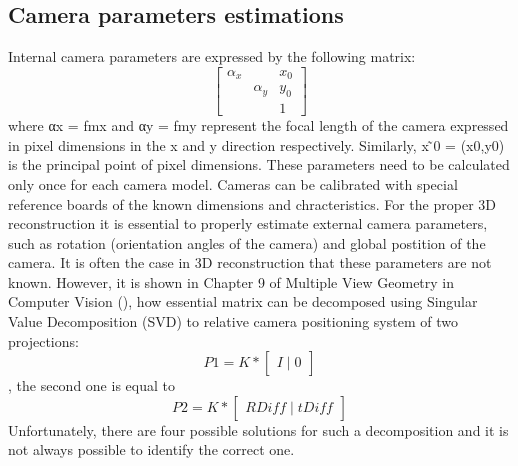 \subsection{Camera parameters estimations}
Internal camera parameters are expressed by the following matrix:
\begin{equation}
\begin{bmatrix}
\alpha _{x} &  & x_{0} \\ 
 & \alpha _{y} & y_{0}\\ 
 &  & 1
\end{bmatrix}
\end{equation}
where αx = fmx and αy = fmy represent the focal length of the camera expressed in pixel dimensions in the x and y direction respectively. 
Similarly, x ̃0 = (x0,y0) is the principal point of pixel dimensions. These parameters need to be calculated only once for each camera model. Cameras can be calibrated with special reference boards of the known dimensions and chracteristics.
For the proper 3D reconstruction it is essential to properly estimate external camera parameters, such as rotation (orientation angles of the camera) and global postition of the camera. It is often the case in 3D reconstruction that these parameters are not known. However, it is shown in Chapter 9 of Multiple View Geometry in Computer Vision (\cite{HartleyMultipleView}), how essential matrix can be decomposed using Singular Value Decomposition (SVD) to relative camera positioning system of two projections:
\begin{equation}
 P1 = K * \begin{bmatrix}I\mid 0\end{bmatrix}
\end{equation},
the second one is equal to 
\begin{equation}
 P2 = K * \begin{bmatrix}RDiff\mid tDiff\end{bmatrix}
\end{equation}
Unfortunately, there are four possible solutions for such a decomposition and it is not always possible to identify the correct one.

